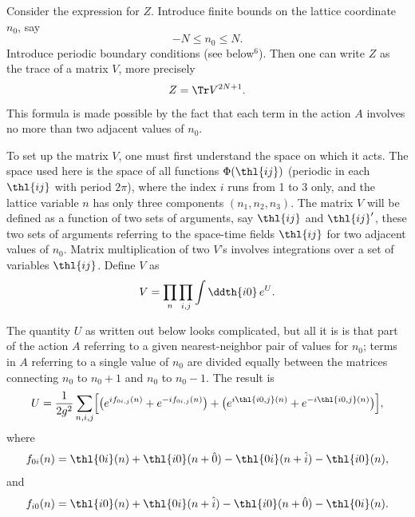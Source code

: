 Consider the expression for $Z$.  Introduce finite bounds on the lattice
coordinate $n_{0}$, say
\begin{equation}
-N \le n_{0} \le N.
\label{eq:3.16}
\end{equation}
Introduce periodic boundary conditions (see below${}^{6}$).  Then one can
write $Z$ as the trace of a matrix $V$, more precisely
\begin{equation}
Z = \Tr V^{2N+1}.
\label{eq:3.17}
\end{equation}
This formula is made possible by the fact that each term in the action
$A$ involves no more than two adjacent values of $n_{0}$.

To set up the matrix $V$, one must first understand the space on which it
acts.  The space used here is the space of all functions
$\Phi(\thl{ij})$ (periodic in each $\thl{ij}$ with period $2\pi$), where
the index $i$ runs from 1 to 3 only, and the lattice variable $n$ has
only three components $(n_{1},n_{2},n_{3})$.  The matrix $V$ will be
defined as a function of two sets of arguments, say $\thl{ij}$ and
$\thl{ij}'$, these two sets of arguments referring to the space-time
fields $\thl{ij}$ for two adjacent values of $n_{0}$.  Matrix
multiplication of two $V$'s involves integrations over a set of variables
$\thl{ij}$.  Define $V$ as
\begin{equation}
V = \prod_{n}\prod_{i,j}\int\ddth{i0}\,e^{U}.
\label{eq:3.18}
\end{equation}

The quantity $U$ as written out below looks complicated, but all it is is
that part of the action $A$ referring to a given nearest-neighbor pair of
values for $n_{0}$; terms in $A$ referring to a single value of $n_{0}$
are divided equally between the matrices connecting $n_{0}$ to
$n_{0}+1$ and $n_{0}$ to $n_{0}-1$.  The result is
\begin{equation}
U = \frac{1}{2g^{2}}\sum_{n,i,j}\Bigl[
    \bigl(e^{if_{0i,j}(n)}+e^{-if_{0i,j}(n)}\bigr)
    +\bigl(e^{i\thl{i0,j}(n)}+e^{-i\thl{i0,j}(n)}\bigr)\Bigr],
\label{eq:3.19}
\end{equation}
where
\begin{equation}
f_{0i}(n) = \thl{0i}(n)+\thl{i0}(n+\hat0)-\thl{0i}(n+\hat i)-\thl{i0}(n),
\label{eq:3.20}
\end{equation}
and
\begin{equation}
f_{i0}(n) = \thl{i0}(n)+\thl{0i}(n+\hat i)-\thl{i0}(n+\hat0)-\thl{0i}(n).
\label{eq:3.21}
\end{equation}

